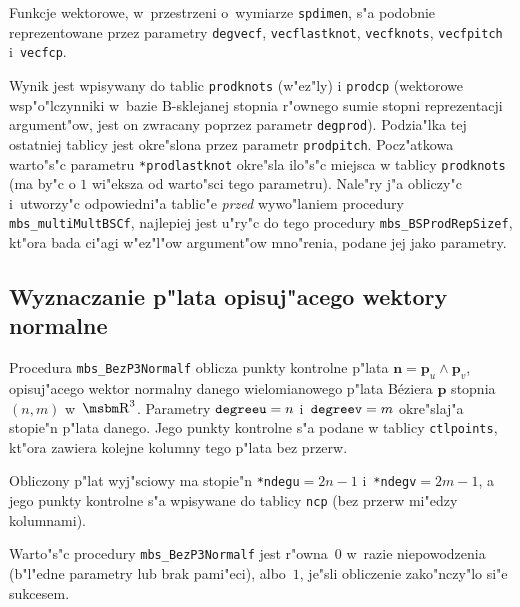 Funkcje wektorowe, w~przestrzeni o~wymiarze \texttt{spdimen}, s"a podobnie
reprezentowane przez parametry \texttt{degvecf}, \texttt{vecflastknot},
\texttt{vecfknots}, \texttt{vecfpitch} i~\texttt{vecfcp}.

Wynik jest wpisywany do tablic \texttt{prodknots} (w"ez"ly) i \texttt{prodcp}
(wektorowe wsp"o"lczynniki w~bazie B-sklejanej stopnia r"ownego sumie
stopni reprezentacji argument"ow, jest on zwracany poprzez parametr
\texttt{degprod}). Podzia"lka tej ostatniej tablicy jest okre"slona przez
parametr \texttt{prodpitch}. Pocz"atkowa warto"s"c parametru
\texttt{*prodlastknot} okre"sla ilo"s"c miejsca w tablicy \texttt{prodknots}
(ma by"c o $1$ wi"eksza od warto"sci tego parametru). Nale"ry j"a obliczy"c
i~utworzy"c odpowiedni"a tablic"e \emph{przed} wywo"laniem procedury
\texttt{mbs\_multiMultBSCf}, najlepiej jest u"ry"c do tego procedury
\texttt{mbs\_BSProdRepSizef}, kt"ora bada ci"agi w"ez"l"ow argument"ow
mno"renia, podane jej jako parametry.


\subsection{Wyznaczanie p"lata opisuj"acego wektory normalne}

\hspace*{\parindent}Procedura \texttt{mbs\_BezP3Normalf} oblicza
punkty kontrolne p"lata $\bm{n}=\bm{p}_u\wedge\bm{p}_v$,
opisuj"acego wektor normalny danego wielomianowego p"lata
B\'{e}ziera $\bm{p}$ stopnia $(n,m)$ w~$\R^3$.
Parametry $\mathord{\mbox{\texttt{degreeu}}}=n$
i~$\mathord{\mbox{\texttt{degreev}}}=m$ okre"slaj"a stopie"n
p"lata danego. Jego punkty kontrolne s"a podane w tablicy
\texttt{ctlpoints}, kt"ora zawiera kolejne kolumny tego p"lata bez przerw.

Obliczony p"lat wyj"sciowy ma stopie"n \texttt{*ndegu}$=2n-1$
i~\texttt{*ndegv}$=2m-1$, a jego punkty kontrolne s"a wpisywane do tablicy
\texttt{ncp} (bez przerw mi"edzy kolumnami).

\begin{sloppypar}
Warto"s"c procedury \texttt{mbs\_BezP3Normalf} jest r"owna~$0$ w~razie
niepowodzenia (b"l"edne parametry lub brak pami"eci), albo~$1$, je"sli
obliczenie zako"nczy"lo si"e sukcesem.
\end{sloppypar}

